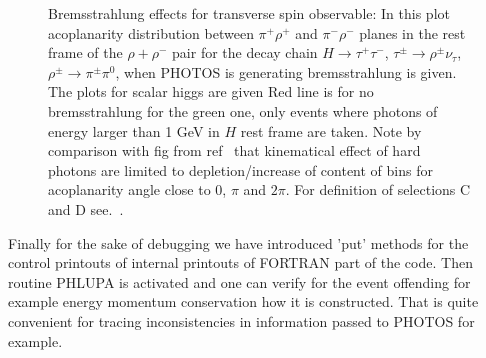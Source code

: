 \documentclass[]{Photos_interface_design}
\begin{document}
\begin{figure}[h!]
\centering
{}
\caption{Bremsstrahlung effects for transverse spin observable:
In this plot acoplanarity distribution between $\pi^+\rho^+$ and 
$\pi^-\rho^-$ planes in the rest frame of the $\rho+ \rho^-$ pair
for the decay
chain  $H\to \tau^+\tau^-$, $\tau^\pm \to \rho^\pm \nu_\tau$, 
$\rho^\pm \to \pi^\pm \pi^0$, when PHOTOS is generating bremsstrahlung is given.
The plots for scalar higgs are given
Red line is for no bremsstrahlung for the green one,
only events where photons of energy larger than 1 GeV in $H$ rest frame are taken.
Note by comparison with fig from ref~\cite{tauolaC++} that kinematical effect
of hard photons are limited to depletion/increase of content of bins for acoplanarity angle close to $0$, $\pi$ and $2\pi$. For definition of selections C and D see.~\cite{Bower:2002zx}. \label{fig:acoplanarity}
}
\end{figure}
Finally for the sake of debugging we have introduced 'put' methods for the 
control printouts of internal printouts of FORTRAN part of the code.
Then routine PHLUPA \cite{Barberio:1993qi} is activated and one can verify  
for the event offending for example  energy momentum conservation how it is 
constructed. That is quite convenient for tracing inconsistencies in information passed to PHOTOS for example.
\end{document}
